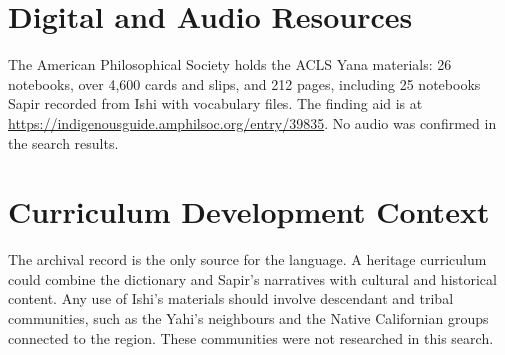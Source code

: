 \documentclass[12pt]{article}
\begin{document}
\section{Digital and Audio Resources}
The American Philosophical Society holds the ACLS Yana materials: 26 notebooks, over 4,600 cards and slips, and 212 pages, including 25 notebooks Sapir recorded from Ishi with vocabulary files. The finding aid is at \url{https://indigenousguide.amphilsoc.org/entry/39835}. No audio was confirmed in the search results.

\section{Curriculum Development Context}
The archival record is the only source for the language. A heritage curriculum could combine the dictionary and Sapir's narratives with cultural and historical content. Any use of Ishi's materials should involve descendant and tribal communities, such as the Yahi's neighbours and the Native Californian groups connected to the region. These communities were not researched in this search.
\end{document}
